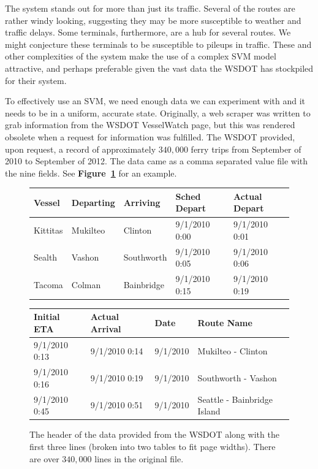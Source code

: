 \documentclass[11pt]{article} %
\begin{document}
The system stands out for more than just its traffic. Several of the routes
are rather windy looking, suggesting they may be more susceptible to weather and
traffic delays. Some terminals, furthermore, are a hub for several routes. We
might conjecture these terminals to be susceptible to pileups in traffic. These 
and other complexities of the system make the use of a complex SVM model attractive,
and perhaps preferable given the vast data the WSDOT has stockpiled for their
system. 

To effectively use an SVM, we need enough data we can experiment with and it needs
to be in a uniform, accurate state. Originally, a web scraper was written to grab
information from the WSDOT VesselWatch \cite{wsdotVesselWatch} page, but this was 
rendered obsolete when a request for information was fulfilled. The WSDOT 
provided, upon request, a record of
approximately $340,000$ ferry trips from September of 2010 to September of 2012. The
data came as a comma separated value file with the nine fields. See 
\textbf{Figure~\ref{fig:example_wsdot_data}} for an example.

\begin{figure}
    \centering
    \begin{tabular}[h]{lllll}
        \hline
        Vessel & Departing & Arriving & Sched Depart & Actual Depart \\
        \hline
        Kittitas & Mukilteo & Clinton & 9/1/2010 0:00 & 9/1/2010 0:01 \\
        Sealth & Vashon & Southworth & 9/1/2010 0:05 & 9/1/2010 0:06 \\
        Tacoma & Colman & Bainbridge & 9/1/2010 0:15 & 9/1/2010 0:19 \\
    \end{tabular}

    \begin{tabular}[h]{llll}
        \hline
        Initial ETA & Actual Arrival & Date & Route Name\\
        \hline
        9/1/2010 0:13 & 9/1/2010 0:14 & 9/1/2010 & Mukilteo - Clinton \\
        9/1/2010 0:16 & 9/1/2010 0:19 & 9/1/2010 & Southworth - Vashon \\
        9/1/2010 0:45 & 9/1/2010 0:51 & 9/1/2010 & Seattle - Bainbridge Island \\
    \end{tabular}
    \caption{The header of the data provided from the WSDOT along with the first
        three lines (broken into two tables
        to fit page widths). There are over $340,000$ lines in the original file.}
    \label{fig:example_wsdot_data}
\end{figure}
\end{document}
